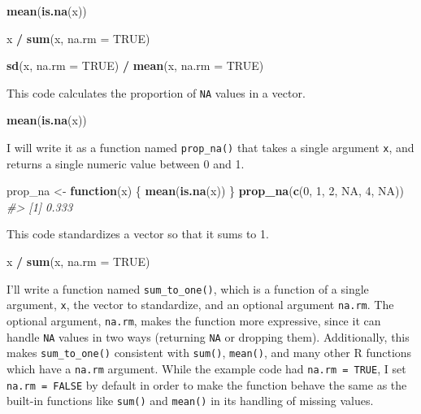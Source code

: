 \documentclass[]{book}
\newenvironment{Shaded}{\begin{snugshade}}{\end{snugshade}}
\newcommand{\CommentTok}[1]{\textcolor[rgb]{0.56,0.35,0.01}{\textit{#1}}}
\newcommand{\ControlFlowTok}[1]{\textcolor[rgb]{0.13,0.29,0.53}{\textbf{#1}}}
\newcommand{\DataTypeTok}[1]{\textcolor[rgb]{0.13,0.29,0.53}{#1}}
\newcommand{\DecValTok}[1]{\textcolor[rgb]{0.00,0.00,0.81}{#1}}
\newcommand{\KeywordTok}[1]{\textcolor[rgb]{0.13,0.29,0.53}{\textbf{#1}}}
\newcommand{\NormalTok}[1]{#1}
\newcommand{\OperatorTok}[1]{\textcolor[rgb]{0.81,0.36,0.00}{\textbf{#1}}}
\newcommand{\OtherTok}[1]{\textcolor[rgb]{0.56,0.35,0.01}{#1}}
\newcommand{\StringTok}[1]{\textcolor[rgb]{0.31,0.60,0.02}{#1}}
\theoremstyle{plain}
\theoremstyle{remark}
\begin{document}
\begin{Shaded}
\begin{Highlighting}[]
\KeywordTok{mean}\NormalTok{(}\KeywordTok{is.na}\NormalTok{(x))}

\NormalTok{x }\OperatorTok{/}\StringTok{ }\KeywordTok{sum}\NormalTok{(x, }\DataTypeTok{na.rm =} \OtherTok{TRUE}\NormalTok{)}

\KeywordTok{sd}\NormalTok{(x, }\DataTypeTok{na.rm =} \OtherTok{TRUE}\NormalTok{) }\OperatorTok{/}\StringTok{ }\KeywordTok{mean}\NormalTok{(x, }\DataTypeTok{na.rm =} \OtherTok{TRUE}\NormalTok{)}
\end{Highlighting}
\end{Shaded}

This code calculates the proportion of \texttt{NA} values in a vector.

\begin{Shaded}
\begin{Highlighting}[]
\KeywordTok{mean}\NormalTok{(}\KeywordTok{is.na}\NormalTok{(x))}
\end{Highlighting}
\end{Shaded}

I will write it as a function named \texttt{prop\_na()} that takes a
single argument \texttt{x}, and returns a single numeric value between 0
and 1.

\begin{Shaded}
\begin{Highlighting}[]
\NormalTok{prop_na <-}\StringTok{ }\ControlFlowTok{function}\NormalTok{(x) \{}
  \KeywordTok{mean}\NormalTok{(}\KeywordTok{is.na}\NormalTok{(x))}
\NormalTok{\}}
\KeywordTok{prop_na}\NormalTok{(}\KeywordTok{c}\NormalTok{(}\DecValTok{0}\NormalTok{, }\DecValTok{1}\NormalTok{, }\DecValTok{2}\NormalTok{, }\OtherTok{NA}\NormalTok{, }\DecValTok{4}\NormalTok{, }\OtherTok{NA}\NormalTok{))}
\CommentTok{#> [1] 0.333}
\end{Highlighting}
\end{Shaded}

This code standardizes a vector so that it sums to 1.

\begin{Shaded}
\begin{Highlighting}[]
\NormalTok{x }\OperatorTok{/}\StringTok{ }\KeywordTok{sum}\NormalTok{(x, }\DataTypeTok{na.rm =} \OtherTok{TRUE}\NormalTok{)}
\end{Highlighting}
\end{Shaded}

I'll write a function named \texttt{sum\_to\_one()}, which is a function
of a single argument, \texttt{x}, the vector to standardize, and an
optional argument \texttt{na.rm}. The optional argument, \texttt{na.rm},
makes the function more expressive, since it can handle \texttt{NA}
values in two ways (returning \texttt{NA} or dropping them).
Additionally, this makes \texttt{sum\_to\_one()} consistent with
\texttt{sum()}, \texttt{mean()}, and many other R functions which have a
\texttt{na.rm} argument. While the example code had
\texttt{na.rm\ =\ TRUE}, I set \texttt{na.rm\ =\ FALSE} by default in
order to make the function behave the same as the built-in functions
like \texttt{sum()} and \texttt{mean()} in its handling of missing
values.
\end{document}
